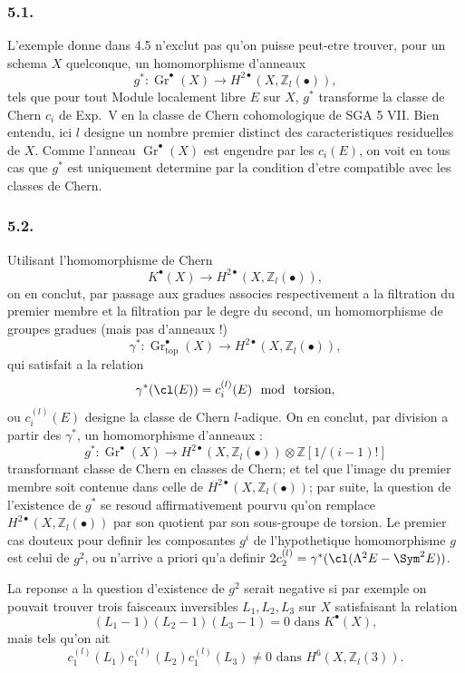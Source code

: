 \subsubsection*{5.1.}
L'exemple donne dans 4.5 n'exclut pas qu'on puisse peut-etre trouver, pour un schema $X$ quelconque, un homomorphisme d'anneaux
\[
g^{*} : \operatorname{Gr}^{\bullet}(X) \longrightarrow H^{2\bullet}(X, \mathbb{Z}_l(\bullet)),
\]
tels que pour tout Module localement libre $E$ sur $X$, $g^{*}$ transforme la classe de Chern $c_i$ de Exp.\ V en la classe de Chern cohomologique de SGA 5 VII. Bien entendu, ici $l$ designe un nombre premier distinct des caracteristiques residuelles de $X$. Comme l'anneau $\operatorname{Gr}^{\bullet}(X)$ est engendre par les $c_i(E)$, on voit en tous cas que $g^{*}$ est uniquement determine par la condition d'etre compatible avec les classes de Chern.

\subsubsection*{5.2.}
Utilisant l'homomorphisme de Chern
\[
K^{\bullet}(X) \longrightarrow H^{2\bullet}(X, \mathbb{Z}_l(\bullet)),
\]
on en conclut, par passage aux gradues associes respectivement a la filtration du premier membre et la filtration par le degre du second, un homomorphisme de groupes gradues (mais pas d'anneaux !)
\[
\gamma^{*} : \operatorname{Gr}_{\mathrm{top}}^{\bullet}(X) \longrightarrow H^{2\bullet}(X, \mathbb{Z}_l(\bullet)),
\]
qui satisfait a la relation
\[
\gamma^{*}(\cl(E)) = c_i^{(l)}(E) \mod \text{ torsion},
\]
ou $c_i^{(l)}(E)$ designe la classe de Chern $l$-adique. On en conclut, par division a partir des $\gamma^{*}$, un homomorphisme d'anneaux :
\[
g^{*} : \operatorname{Gr}^{\bullet}(X) \longrightarrow H^{2\bullet}(X, \mathbb{Z}_l(\bullet)) \otimes \mathbb{Z}[1/(i-1)!]
\]
transformant classe de Chern en classes de Chern; et tel que l'image du premier membre soit contenue dans celle de $H^{2\bullet}(X, \mathbb{Z}_l(\bullet))$; par suite, la question de l'existence de $g^{*}$ se resoud affirmativement pourvu qu'on remplace $H^{2\bullet}(X, \mathbb{Z}_l(\bullet))$ par son quotient par son sous-groupe de torsion. Le premier cas douteux pour definir les composantes $g^{i}$ de l'hypothetique homomorphisme $g$ est celui de $g^{2}$, ou n'arrive a priori qu'a definir $2c_2^{(l)} = \gamma^{*}(\cl(\Lambda^2 E - \Sym^2 E))$.

La reponse a la question d'existence de $g^{2}$ serait negative si par exemple on pouvait trouver trois faisceaux inversibles $L_1, L_2, L_3$ sur $X$ satisfaisant la relation
\[
(L_1 - 1)(L_2 - 1)(L_3 - 1) = 0 \text{ dans } K^{\bullet}(X),
\]
mais tels qu'on ait
\[
c_1^{(l)}(L_1) c_1^{(l)}(L_2) c_1^{(l)}(L_3) \neq 0 \text{ dans } H^{6}(X, \mathbb{Z}_l(3)).
\]

